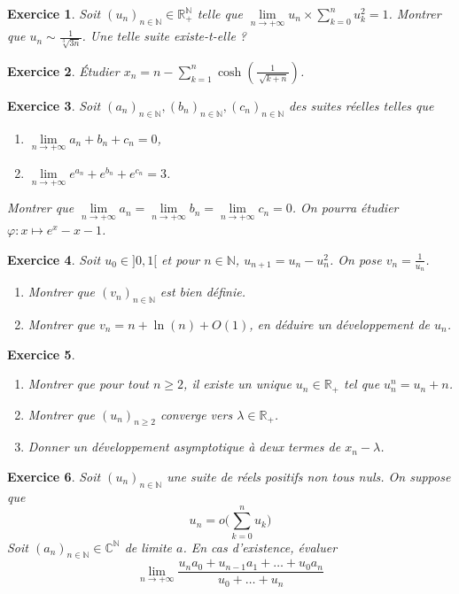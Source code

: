 \documentclass[12pt]{article}
\newtheorem{exercise}{Exercice}[section]
\theoremstyle{remark}
\theoremstyle{remark}
\newcommand{\R}{\mathbb{R}}
\newcommand{\C}{\mathbb{C}}
\newcommand{\N}{\mathbb{N}}
\begin{document}
\begin{exercise}
	Soit $(u_{n})_{n\in\N}\in\R_{+}^{\N}$ telle que
	$\lim\limits_{n\to+\infty}u_{n}\times\sum_{k=0}^{n}u_{k}^{2}=1$.
	Montrer que $u_{n}\sim\frac{1}{\sqrt[3]{3n}}$. Une telle suite existe-t-elle
	?
\end{exercise}

\begin{exercise}
	Étudier $x_{n}=n-\sum_{k=1}^{n}\cosh(\frac{1}{\sqrt[]{k+n}})$.
\end{exercise}

\begin{exercise}
	Soit $(a_{n})_{n\in\N},(b_{n})_{n\in\N},(c_{n})_{n\in\N}$ des suites réelles
	telles que 
	\begin{enumerate}
		\item [(i)] $\lim\limits_{n\to+\infty}a_{n}+b_{n}+c_{n}=0$,
		\item [(ii)] $\lim\limits_{n\to+\infty}e^{a_{n}}+e^{b_{n}}+e^{c_{n}}=3$.
	\end{enumerate}
	Montrer que
	$\lim\limits_{n\to+\infty}a_{n}=\lim\limits_{n\to+\infty}b_{n}=\lim\limits_{n\to+\infty}c_{n}=0$.
	On pourra étudier $\varphi:x\mapsto e^{x}-x-1$.
\end{exercise}

\begin{exercise}
	Soit $u_{0}\in]0,1[$ et pour $n\in\N$, $u_{n+1}=u_{n}-u_{n}^{2}$. On pose
	$v_{n}=\frac{1}{u_{n}}$.
	\begin{enumerate}
		\item Montrer que $(v_{n})_{n\in\N}$ est bien définie.
		\item Montrer que $v_{n}=n+\ln(n)+O(1)$, en déduire un développement de $u_{n}$.
	\end{enumerate}
\end{exercise}

\begin{exercise}
	\phantom{}
	\begin{enumerate}
		\item Montrer que pour tout $n\geqslant 2$, il existe un unique
		$u_{n}\in\R_{+}$ tel que $u_{n}^{n}=u_{n}+n$.
		\item Montrer que $(u_{n})_{n\geqslant 2}$ converge vers $\lambda\in\R_{+}$.
		\item Donner un développement asymptotique à deux termes de $x_{n}-\lambda$.
	\end{enumerate}
\end{exercise}

\begin{exercise}
	Soit $(u_{n})_{n\in\N}$ une suite de réels positifs non tous nuls. On
	suppose que 
	$$u_n=o\Biggl(\sum_{k=0}^{n}u_{k}\Biggr)$$ 
	Soit
	$(a_{n})_{n\in\N}\in\C^{\N}$ de limite $a$. En cas d'existence, évaluer
	$$\lim\limits_{n\to+\infty}\frac{u_{n}a_{0}+u_{n-1}a_{1}+\dots+u_{0}a_{n}}{u_{0}+\dots+u_{n}}$$
\end{exercise}
\end{document}

